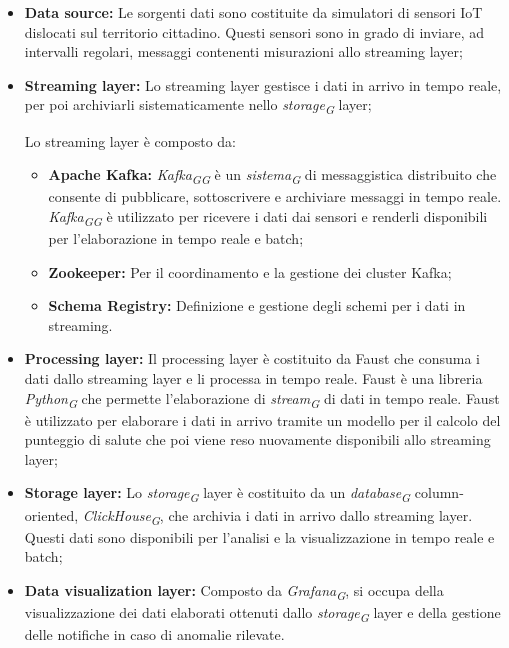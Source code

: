 \begin{itemize}
    \item \textbf{Data source:} Le sorgenti dati sono costituite da simulatori di sensori IoT dislocati sul territorio cittadino. Questi sensori sono in grado di inviare, ad intervalli regolari, messaggi contenenti misurazioni allo streaming layer;
    
    \item \textbf{Streaming layer:} Lo streaming layer gestisce i dati in arrivo in tempo reale, per poi archiviarli sistematicamente nello \textit{storage}\textsubscript{\textit{G}} layer;
    
    Lo streaming layer è composto da:
    \begin{itemize}
        \item \textbf{Apache Kafka:} \textit{Kafka}\textsubscript{\textit{G}}\textsubscript{\textit{G}} è un \textit{sistema}\textsubscript{\textit{G}} di messaggistica distribuito che consente di pubblicare, sottoscrivere e archiviare messaggi in tempo reale. \textit{Kafka}\textsubscript{\textit{G}}\textsubscript{\textit{G}} è utilizzato per ricevere i dati dai sensori e renderli disponibili per l'elaborazione in tempo reale e batch;
        
        \item \textbf{Zookeeper:} Per il coordinamento e la gestione dei cluster Kafka;
        \item \textbf{Schema Registry:} Definizione e gestione degli schemi per i dati in streaming.
    \end{itemize}

    \item \textbf{Processing layer:} Il processing layer è costituito da Faust che consuma i dati dallo streaming layer e li processa in tempo reale. Faust è una libreria \textit{Python}\textsubscript{\textit{G}} che permette l'elaborazione di \textit{stream}\textsubscript{\textit{G}} di dati in tempo reale. Faust è utilizzato per elaborare i dati in arrivo tramite un modello per il calcolo del punteggio di salute che poi viene reso nuovamente disponibili allo streaming layer;
    
    \item \textbf{Storage layer:} Lo \textit{storage}\textsubscript{\textit{G}} layer è costituito da un \textit{database}\textsubscript{\textit{G}} column-oriented, \textit{ClickHouse}\textsubscript{\textit{G}}, che archivia i dati in arrivo dallo streaming layer. Questi dati sono disponibili per l'analisi e la visualizzazione in tempo reale e batch;
    
    \item \textbf{Data visualization layer:} Composto da \textit{Grafana}\textsubscript{\textit{G}}, si occupa della visualizzazione dei dati elaborati ottenuti dallo \textit{storage}\textsubscript{\textit{G}} layer e della gestione delle notifiche in caso di anomalie rilevate.
\end{itemize}